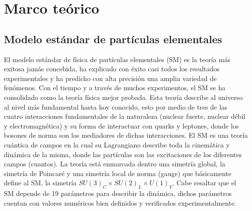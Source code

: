 \chapter{Marco teórico}

\section{Modelo estándar de partículas elementales}

El modelo estándar de física de partículas elementales (SM) es la teoría más exitosa jamás concebida, ha explicado con éxito casi todos los resultados experimentales y ha predicho con alta precisión una amplia variedad de fenómenos. Con el tiempo y a través de muchos experimentos, el SM se ha consolidado como la teoría física mejor probada. Esta teoría describe al universo al nivel más fundamental hasta hoy conocido, esto por medio de tres de las cuatro interacciones fundamentales de la naturaleza (nuclear fuerte, nuclear débil y electromagnética) y su forma de interactuar con quarks y leptones, donde los bosones de norma son los mediadores de dichas interacciones. El SM es una teoría cuántica de campos en la cual su Lagrangiano describe toda la cinemática y dinámica de la misma, donde las partículas son las excitaciones de los diferentes campos (cuantos). La  teoría está enmarcada dentro una simetría global, la simetría de Poincaré y una simetría local de norma (gauge) que básicamente define al SM, la simetría \(SU(3)_{C}\times SU(2)_{L}\times U(1)_{Y}\). Cabe resaltar que el SM depende de 19 parámetros para describir la dinámica, dichos parámetros cuentan con valores numéricos bien definidos y verificados experimentalmente.

